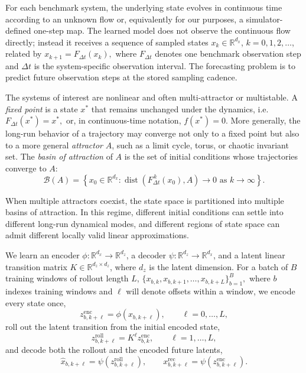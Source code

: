 For each benchmark system, the underlying state evolves in continuous time according to an unknown flow or, equivalently for our purposes, a simulator-defined one-step map.  
The learned model does not observe the continuous flow directly; instead it receives a sequence of sampled states \(x_k \in \mathbb{R}^{d_x}\), \(k=0,1,2,\dots\), related by 
$x_{k+1} = F_{\Delta t}(x_k),$ 
where \(F_{\Delta t}\) denotes one benchmark observation step and \(\Delta t\) is the system-specific observation interval. The forecasting problem is to predict future observation steps at the stored sampling cadence.

The systems of interest are nonlinear and often multi-attractor or multistable. A \emph{fixed point} is a state \(x^\ast\) that remains unchanged under the dynamics, i.e. $F_{\Delta t}(x^\ast) = x^\ast,$ or, in continuous-time notation, \(f(x^\ast)=0\). More generally, the long-run behavior of a trajectory may converge not only to a fixed point but also to a
  more general \emph{attractor} \(A\), such as a limit cycle, torus, or chaotic invariant set. The \emph{basin of attraction} of \(A\) is the set of initial
  conditions whose trajectories converge to \(A\):
  \begin{equation}
      \mathcal{B}(A)
      =
      \left\{
          x_0 \in \mathbb{R}^{d_x}
          :
          \operatorname{dist}\!\left(F_{\Delta t}^{\,k}(x_0), A\right) \to 0
          \text{ as } k \to \infty
      \right\}.
  \end{equation}

When multiple attractors coexist, the state space is partitioned into multiple basins of attraction. In this regime, different initial conditions can settle into different long-run dynamical modes, and different regions of state space can admit different locally valid linear approximations. 

We learn an encoder $\phi : \mathbb{R}^{d_x} \rightarrow \mathbb{R}^{d_z}$, a decoder $\psi : \mathbb{R}^{d_z} \rightarrow \mathbb{R}^{d_x}$, and a latent linear transition matrix $K \in \mathbb{R}^{d_z \times d_z}$, where $d_z$ is the latent dimension. For a batch of $B$ training windows of rollout length $L$,
$\{x_{b,k}, x_{b,k+1}, \dots, x_{b,k+L}\}_{b=1}^{B},$
where $b$ indexes training windows and $\ell$ will denote offsets within a window,
we encode every state once,
\begin{equation}
    z_{b,k+\ell}^{\mathrm{enc}} = \phi(x_{b,k+\ell}), \qquad \ell = 0, \dots, L,
\end{equation}
roll out the latent transition from the initial encoded state,
\begin{equation}
    z_{b,k+\ell}^{\mathrm{roll}} = K^\ell z_{b,k}^{\mathrm{enc}}, \qquad \ell = 1, \dots, L,
\end{equation}
and decode both the rollout and the encoded future latents,
\begin{equation}
    \hat{x}_{b,k+\ell} = \psi(z_{b,k+\ell}^{\mathrm{roll}}), \qquad
    x_{b,k+\ell}^{\mathrm{rec}} = \psi(z_{b,k+\ell}^{\mathrm{enc}}).
\end{equation}

